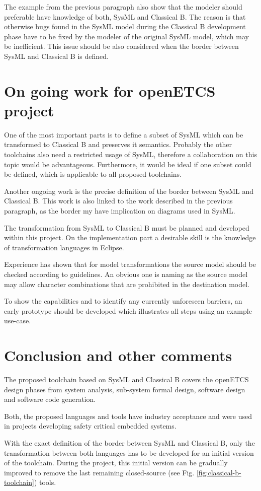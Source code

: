 The example from the previous paragraph also show that the modeler
should preferable have knowledge of both, SysML and Classical B. The
reason is that otherwise bugs found in the SysML model during the
Classical B development phase have to be fixed by the modeler of the
original SysML model, which may be inefficient. This issue should be
also considered when the border between SysML and Classical B is
defined.

\section{On going work for openETCS project}

One of the most important parts is to define a subset of SysML which
can be transformed to Classical B and preserves it semantics. Probably
the other toolchains also need a restricted usage of SysML, therefore
a collaboration on this topic would be advantageous. Furthermore, it
would be ideal if one subset could be defined, which is applicable to
all proposed toolchains.

Another ongoing work is the precise definition of the border between
SysML and Classical B. This work is also linked to the work described
in the previous paragraph, as the border my have implication on
diagrams used in SysML.

The transformation from SysML to Classical B must be planned and
developed within this project. On the implementation part a desirable
skill is the knowledge of transformation languages in Eclipse.

Experience has shown that for model transformations the source model
should be checked according to guidelines. An obvious one is naming as
the source model may allow character combinations that are prohibited
in the destination model.

To show the capabilities and to identify any currently unforeseen
barriers, an early prototype should be developed which illustrates all
steps using an example use-case.

\section{Conclusion and other comments}

The proposed toolchain based on SysML and Classical B covers the
openETCS design phases from system analysis, sub-system formal design,
software design and software code generation.

Both, the proposed languages and tools have industry acceptance and
were used in projects developing safety critical embedded systems. 

With the exact definition of the border between SysML and Classical B,
only the transformation between both languages has to be developed for
an initial version of the toolchain. During the project, this initial
version can be gradually improved to remove the last remaining
closed-source (see Fig. \ref{fig:classical-b-toolchain}) tools.
